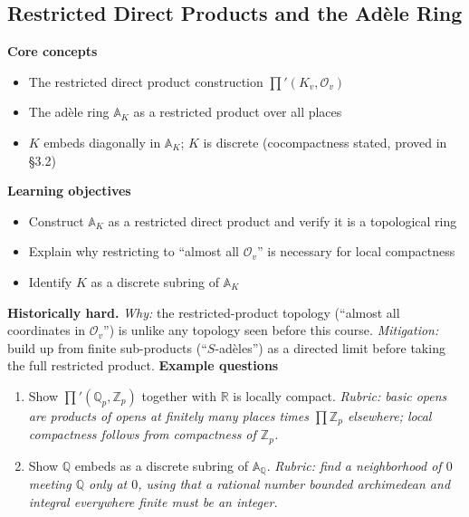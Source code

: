 \documentclass[11pt]{article}
\newcommand{\Q}{\mathbb{Q}}
\newcommand{\A}{\mathbb{A}}
\newcommand{\Zp}{\mathbb{Z}_p}
\begin{document}
\subsection{Restricted Direct Products and the Adèle Ring}
\textbf{Core concepts}
\begin{itemize}[noitemsep]
  \item The restricted direct product construction $\prod'(K_v, \mathcal{O}_v)$
  \item The adèle ring $\A_K$ as a restricted product over all places
  \item $K$ embeds diagonally in $\A_K$; $K$ is discrete (cocompactness stated, proved in \S3.2)
\end{itemize}
\textbf{Learning objectives}
\begin{itemize}[noitemsep]
  \item Construct $\A_K$ as a restricted direct product and verify it is a topological ring
  \item Explain why restricting to ``almost all $\mathcal{O}_v$'' is necessary for local compactness
  \item Identify $K$ as a discrete subring of $\A_K$
\end{itemize}
\textbf{Historically hard.} \emph{Why:} the restricted-product topology (``almost all coordinates in $\mathcal{O}_v$'') is unlike any topology seen before this course. \emph{Mitigation:} build up from finite sub-products (``$S$-adèles'') as a directed limit before taking the full restricted product.
\textbf{Example questions}
\begin{enumerate}[noitemsep]
  \item[Q1 (foundational).] Show $\prod'(\Q_p,\Zp)$ together with $\mathbb R$ is locally compact. \emph{Rubric: basic opens are products of opens at finitely many places times $\prod \Zp$ elsewhere; local compactness follows from compactness of $\Zp$.}
  \item[Q2 (advanced).] Show $\Q$ embeds as a discrete subring of $\A_\Q$. \emph{Rubric: find a neighborhood of $0$ meeting $\Q$ only at $0$, using that a rational number bounded archimedean and integral everywhere finite must be an integer.}
\end{enumerate}

\end{document}
